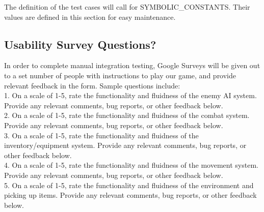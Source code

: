 \documentclass[12pt, titlepage]{article}
\begin{document}
The definition of the test cases will call for SYMBOLIC\_CONSTANTS.
Their values are defined in this section for easy maintenance.

\subsection{Usability Survey Questions?}

In order to complete manual integration testing, Google Surveys will be given out to a set number of people with instructions to play our game, and provide relevant feedback in the form. Sample questions include: \\

1. On a scale of 1-5, rate the functionality and fluidness of the enemy AI system. Provide any relevant comments, bug reports, or other feedback below.\\

2. On a scale of 1-5, rate the functionality and fluidness of the combat system. Provide any relevant comments, bug reports, or other feedback below.\\

3. On a scale of 1-5, rate the functionality and fluidness of the inventory/equipment system. Provide any relevant comments, bug reports, or other feedback below.\\

4. On a scale of 1-5, rate the functionality and fluidness of the movement system. Provide any relevant comments, bug reports, or other feedback below.\\

5. On a scale of 1-5, rate the functionality and fluidness of the environment and picking up items. Provide any relevant comments, bug reports, or other feedback below.\\
\end{document}
